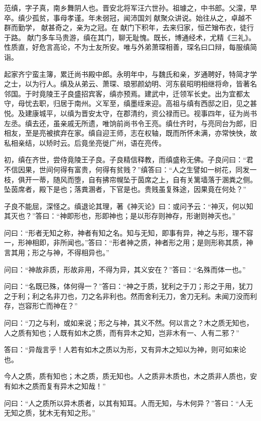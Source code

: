 \documentclass[12pt,UTF8]{ctexbook}
\begin{document}
范缜，字子真，南乡舞阴人也。晋安北将军汪六世孙。祖璩之，中书郎。父濛，早卒。缜少孤贫，事母孝谨。年未弱冠，闻沛国刘献聚众讲说。始往从之，卓越不群而勤学，献甚奇之，亲为之冠。在献门下积年，去来归家，恒芒矰布衣，徒行于路。献门多车马贵游，缜在其门，聊无耻愧。既长，博通经术，尤精《三礼》。性质直，好危言高论，不为士友所安。唯与外弟萧琛相善，琛名曰口辩，每服缜简诣。

起家齐宁蛮主簿，累迁尚书殿中郎。永明年中，与魏氏和亲，岁通聘好，特简才学之士，以为行人。缜及从弟云、萧琛、琅邪颜幼明、河东裴昭明相继将命，皆著名邻国。于时竟陵王子良盛招宾客，缜亦预焉。建武中，迁领军长史。出为宜都太守，母忧去职，归居于南州。义军至，缜墨绖来迎。高祖与缜有西邸之旧，见之甚悦。及建康城平，以缜为晋安太守，在郡清约，资公禄而已。视事四年，征为尚书左丞。缜去还，虽亲戚无所遗，唯饷前尚书令王亮。缜仕齐时，与亮同台为郎，旧相友，至是亮被摈弃在家。缜自迎王师，志在权轴，既而所怀未满，亦常怏怏，故私相亲结，以矫时云。后竟坐亮徙广州，语在亮传。

初，缜在齐世，尝侍竟陵王子良。子良精信释教，而缜盛称无佛。子良问曰：“君不信因果，世间何得有富贵，何得有贫贱？”缜答曰：“人之生譬如一树花，同发一枝，俱开一蒂，随风而堕，自有拂帘幌坠于茵席之上，自有关篱墙落于溷粪之侧。坠茵席者，殿下是也；落粪溷者，下官是也。贵贱虽复殊途，因果竟在何处？”

子良不能屈，深怪之。缜退论其理，著《神灭论》曰：或问予云：“神灭，何以知其灭也？”答曰：“神即形也，形即神也；是以形存则神存，形谢则神灭也。”

问曰：“形者无知之称，神者有知之名。知与无知，即事有异，神之与形，理不容一，形神相即，非所闻也。”答曰：“形者神之质，神者形之用；是则形称其质，神言其用；形之与神，不得相异也。”

问曰：“神故非质，形故非用，不得为异，其义安在？”答曰：“名殊而体一也。”

问曰：“名既已殊，体何得一？”答曰：“神之于质，犹利之于刀；形之于用，犹刀之于利；利之名非刀也，刀之名非利也。然而舍利无刀，舍刀无利。未闻刀没而利存，岂容形亡而神在？”

问曰：“刀之与利，或如来说；形之与神，其义不然。何以言之？木之质无知也，人之质有知也；人既有如木之质，而有异木之知，岂非木有一、人有二邪？”

答曰：“异哉言乎！人若有如木之质以为形，又有异木之知以为神，则可如来论也。

今人之质，质有知也；木之质，质无知也。人之质非木质也，木之质非人质也，安有如木之质而复有异木之知哉！”

问曰：“人之质所以异木质者，以其有知耳。人而无知，与木何异？”答曰：“人无无知之质，犹木无有知之形。”
\end{document}
